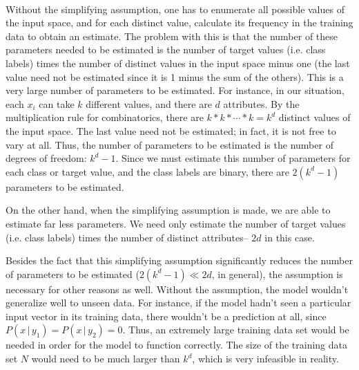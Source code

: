 \documentclass[12pt]{article}
\begin{document}
	\paragraph{}
	Without the simplifying assumption, one has to enumerate all possible values of the input space, and for each distinct value, calculate its frequency in the training data to obtain an estimate. The problem with this is that the number of these parameters needed to be estimated is the number of target values (i.e. class labels) times the number of distinct values in the input space minus one (the last value need not be estimated since it is 1 minus the sum of the others). This is a very large number of parameters to be estimated. For instance, in our situation, each $x_i$ can take $k$ different values, and there are $d$ attributes. By the multiplication rule for combinatorics, there are $k * k * \cdots * k = k^d$ distinct values of the input space. The last value need not be estimated; in fact, it is not free to vary  at all. Thus, the number of parameters to be estimated is the number of degrees of freedom: $k^{d} - 1$. Since we must estimate this number of parameters for each class or target value, and the class labels are binary, there are $2(k^{d} - 1)$ parameters to be estimated. \par
	On the other hand, when the simplifying assumption is made, we are able to estimate far less parameters. We need only estimate the number of target values (i.e. class labels) times the number of distinct attributes-- $2d$ in this case. \par
	Besides the fact that this simplifying assumption significantly reduces the number of parameters to be estimated ($2(k^{d} - 1) \ll 2d$, in general), the assumption is necessary for other reasons as well. Without the assumption, the model wouldn't generalize well to unseen data. For instance, if the model hadn't seen a particular input vector in its training data, there wouldn't be a prediction at all, since $P(x \, \vert \, y_{1}) = P(x \, \vert \, y_{2})= 0$. Thus, an extremely large training data set would be needed in order for the model to function correctly. The size of the training data set $N$ would need to be much larger than $k^{d}$, which is very infeasible in reality. 
	
\end{document}
